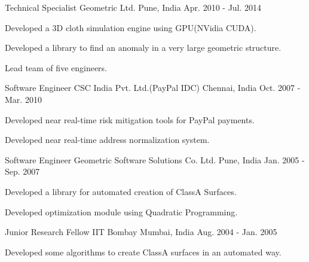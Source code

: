 \begin{cventries}
  \cventry
    {Technical Specialist} %
    {Geometric Ltd.} %
    {Pune, India} %
    {Apr. 2010 - Jul. 2014} %
    {
      \begin{cvitems} %
        \item {Developed a 3D cloth simulation engine using GPU(NVidia CUDA).}
        \item {Developed a library to find an anomaly in a very large geometric structure.}
        \item {Lead team of five engineers.}
      \end{cvitems}
    }

  \cventry
    {Software Engineer} %
    {CSC India Pvt. Ltd.(PayPal IDC)} %
    {Chennai, India} %
    {Oct. 2007 - Mar. 2010} %
    {
      \begin{cvitems} %
        \item {Developed near real-time risk mitigation tools for PayPal payments.}
        \item {Developed near real-time address normalization system.}
      \end{cvitems}
    }

  \cventry
    {Software Engineer} %
    {Geometric Software Solutions Co. Ltd.} %
    {Pune, India} %
    {Jan. 2005 - Sep. 2007} %
    {
      \begin{cvitems} %
        \item {Developed a library for automated creation of ClassA Surfaces.}
        \item {Developed optimization module using Quadratic Programming.} 
      \end{cvitems}
    }

  \cventry
    {Junior Research Fellow} %
    {IIT Bombay} %
    {Mumbai, India} %
    {Aug. 2004 - Jan. 2005} %
    {
      \begin{cvitems} %
        \item {Developed some algorithms to create ClassA surfaces in an automated way.}
      \end{cvitems}
    }
\end{cventries}
